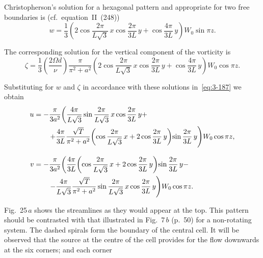 Christopherson's solution for a hexagonal pattern and appropriate for two free boundaries is (cf.\ equation~II~(248))
\begin{equation}\label{eq:3-205}
w = \frac{1}{3}\!\left(2\cos\frac{2\pi}{L\sqrt{3}}\,x\cos\frac{2\pi}{3L}\,y + \cos\frac{4\pi}{3L}\,y\right)\!W_0\sin\pi z.
\end{equation}

The corresponding solution for the vertical component of the vorticity is
\begin{equation}\label{eq:3-206}
\zeta = \frac{1}{3}\!\left(\frac{2\Omega d}{\nu}\right)\!\frac{\pi}{\pi^2 + a^2}\!\left(2\cos\frac{2\pi}{L\sqrt{3}}\,x\cos\frac{2\pi}{3L}\,y + \cos\frac{4\pi}{3L}\,y\right)\!W_0\cos\pi z.
\end{equation}

Substituting for $w$ and $\zeta$ in accordance with these solutions in~\eqref{eq:3-187} we obtain
\begin{align}
\mathbf{u} &= -\frac{\pi}{3a^2}\!\left(\frac{4\pi}{L\sqrt{3}}\sin\frac{2\pi}{L\sqrt{3}}\,x\cos\frac{2\pi}{3L}\,y + \right.\notag\\
&\qquad\left. +\frac{4\pi}{3L}\frac{\sqrt{\mathscr{T}}}{\pi^2 + a^2}\!\left(\cos\frac{2\pi}{L\sqrt{3}}\,x + 2\cos\frac{2\pi}{3L}\,y\right)\!\sin\frac{2\pi}{3L}\,y\right)\!W_0\cos\pi z, \notag\\[8pt]
\mathbf{v} &= -\frac{\pi}{3a^2}\!\left(\frac{4\pi}{3L}\!\left(\cos\frac{2\pi}{L\sqrt{3}}\,x + 2\cos\frac{2\pi}{3L}\,y\right)\!\sin\frac{2\pi}{3L}\,y - \right.\notag\\
&\qquad\left. -\frac{4\pi}{L\sqrt{3}}\frac{\sqrt{\mathscr{T}}}{\pi^2 + a^2}\sin\frac{2\pi}{L\sqrt{3}}\,x\cos\frac{2\pi}{3L}\,y\right)\!W_0\cos\pi z. \label{eq:3-207}
\end{align}


Fig.~25\,$a$ shows the streamlines as they would appear at the top. This pattern should be contrasted with that illustrated in Fig.~7\,$b$ (p.~50) for a non-rotating system. The dashed spirals form the boundary of the central cell. It will be observed that the source at the centre of the cell provides for the flow downwards at the six corners; and each corner


